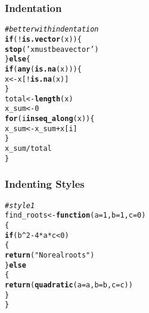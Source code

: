 \documentclass[12pt]{beamer}\usepackage[]{graphicx}\usepackage[]{color}
\makeatletter
\newcommand{\hlnum}[1]{\textcolor[rgb]{0.686,0.059,0.569}{#1}}%
\newcommand{\hlstr}[1]{\textcolor[rgb]{0.192,0.494,0.8}{#1}}%
\newcommand{\hlcom}[1]{\textcolor[rgb]{0.678,0.584,0.686}{\textit{#1}}}%
\newcommand{\hlopt}[1]{\textcolor[rgb]{0,0,0}{#1}}%
\newcommand{\hlstd}[1]{\textcolor[rgb]{0.345,0.345,0.345}{#1}}%
\newcommand{\hlkwa}[1]{\textcolor[rgb]{0.161,0.373,0.58}{\textbf{#1}}}%
\newcommand{\hlkwb}[1]{\textcolor[rgb]{0.69,0.353,0.396}{#1}}%
\newcommand{\hlkwc}[1]{\textcolor[rgb]{0.333,0.667,0.333}{#1}}%
\newcommand{\hlkwd}[1]{\textcolor[rgb]{0.737,0.353,0.396}{\textbf{#1}}}%
\newenvironment{kframe}{%
 \def\at@end@of@kframe{}%
 \ifinner\ifhmode%
  \def\at@end@of@kframe{\end{minipage}}%
  \begin{minipage}{\columnwidth}%
 \fi\fi%
 \def\FrameCommand##1{\hskip\@totalleftmargin \hskip-\fboxsep
 \colorbox{shadecolor}{##1}\hskip-\fboxsep
     \hskip-\linewidth \hskip-\@totalleftmargin \hskip\columnwidth}%
 \MakeFramed {\advance\hsize-\width
   \@totalleftmargin\z@ \linewidth\hsize
   \@setminipage}}%
 {\par\unskip\endMakeFramed%
 \at@end@of@kframe}
\newenvironment{knitrout}{}{} %
\makeatother
\begin{document}
\begin{frame}[fragile]
\frametitle{Indentation}

\begin{knitrout}\footnotesize
{}\color{fgcolor}\begin{kframe}
\begin{alltt}
\hlcom{# better with indentation}
\hlkwa{if}\hlstd{(}\hlopt{!}\hlkwd{is.vector}\hlstd{(x)) \{}
  \hlkwd{stop}\hlstd{(}\hlstr{'x must be a vector'}\hlstd{)}
\hlstd{\}} \hlkwa{else} \hlstd{\{}
  \hlkwa{if}\hlstd{(}\hlkwd{any}\hlstd{(}\hlkwd{is.na}\hlstd{(x))) \{}
    \hlstd{x} \hlkwb{<-} \hlstd{x[}\hlopt{!}\hlkwd{is.na}\hlstd{(x)]}
  \hlstd{\}}
  \hlstd{total} \hlkwb{<-} \hlkwd{length}\hlstd{(x)}
  \hlstd{x_sum} \hlkwb{<-} \hlnum{0}
  \hlkwa{for} \hlstd{(i} \hlkwa{in} \hlkwd{seq_along}\hlstd{(x)) \{}
    \hlstd{x_sum} \hlkwb{<-} \hlstd{x_sum} \hlopt{+} \hlstd{x[i]}
  \hlstd{\}}
  \hlstd{x_sum} \hlopt{/} \hlstd{total}
\hlstd{\}}
\end{alltt}
\end{kframe}
\end{knitrout}

\end{frame}


\begin{frame}[fragile]
\frametitle{Indenting Styles}

\begin{knitrout}\footnotesize
{}\color{fgcolor}\begin{kframe}
\begin{alltt}
\hlcom{# style 1}
\hlstd{find_roots} \hlkwb{<-} \hlkwa{function}\hlstd{(}\hlkwc{a} \hlstd{=} \hlnum{1}\hlstd{,} \hlkwc{b} \hlstd{=} \hlnum{1}\hlstd{,} \hlkwc{c} \hlstd{=} \hlnum{0}\hlstd{)}
\hlstd{\{}
  \hlkwa{if} \hlstd{(b}\hlopt{^}\hlnum{2} \hlopt{-} \hlnum{4}\hlopt{*}\hlstd{a}\hlopt{*}\hlstd{c} \hlopt{<} \hlnum{0}\hlstd{)}
  \hlstd{\{}
    \hlkwd{return}\hlstd{(}\hlstr{"No real roots"}\hlstd{)}
  \hlstd{\}} \hlkwa{else}
  \hlstd{\{}
    \hlkwd{return}\hlstd{(}\hlkwd{quadratic}\hlstd{(}\hlkwc{a} \hlstd{= a,} \hlkwc{b} \hlstd{= b,} \hlkwc{c} \hlstd{= c))}
  \hlstd{\}}
\hlstd{\}}
\end{alltt}
\end{kframe}
\end{knitrout}

\end{frame}
\end{document}
